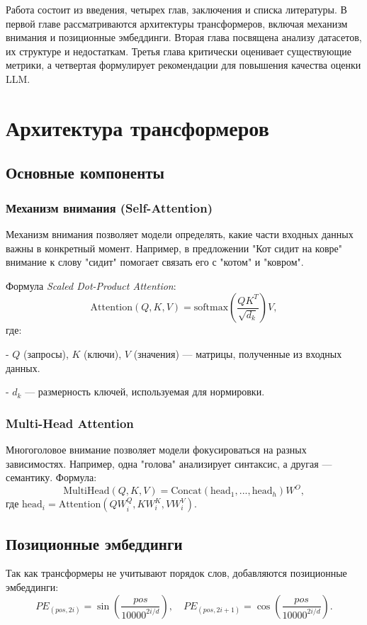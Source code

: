 \documentclass[14pt]{article}
\theoremstyle{definition}
\begin{document}
Работа состоит из введения, четырех глав, заключения и списка литературы. В первой главе рассматриваются архитектуры трансформеров, включая механизм внимания и позиционные эмбеддинги. Вторая глава посвящена анализу датасетов, их структуре и недостаткам. Третья глава критически оценивает существующие метрики, а четвертая формулирует рекомендации для повышения качества оценки LLM.

\newpage

\section{Архитектура трансформеров}
\subsection{Основные компоненты}
\subsubsection{Механизм внимания (Self-Attention)}
Механизм внимания позволяет модели определять, какие части входных данных важны в конкретный момент. Например, в предложении "Кот сидит на ковре" внимание к слову "сидит" помогает связать его с "котом" и "ковром".

Формула \textit{Scaled Dot-Product Attention}:
\[
\text{Attention}(Q, K, V) = \text{softmax}\left(\frac{QK^T}{\sqrt{d_k}}\right)V,
\]
где:

    
- \(Q\) (запросы), \(K\) (ключи), \(V\) (значения) — матрицы, полученные из входных данных.
    
- \(d_k\) — размерность ключей, используемая для нормировки.


\subsubsection{Multi-Head Attention}
Многоголовое внимание позволяет модели фокусироваться на разных зависимостях. Например, одна "голова" анализирует синтаксис, а другая — семантику. Формула:
\[
\text{MultiHead}(Q, K, V) = \text{Concat}(\text{head}_1, ..., \text{head}_h)W^O,
\]
где \(\text{head}_i = \text{Attention}(QW_i^Q, KW_i^K, VW_i^V)\).

\subsection{Позиционные эмбеддинги}
Так как трансформеры не учитывают порядок слов, добавляются позиционные эмбеддинги:
\[
PE_{(pos, 2i)} = \sin\left(\frac{pos}{10000^{2i/d}}\right), \quad PE_{(pos, 2i+1)} = \cos\left(\frac{pos}{10000^{2i/d}}\right).
\]
\end{document}
